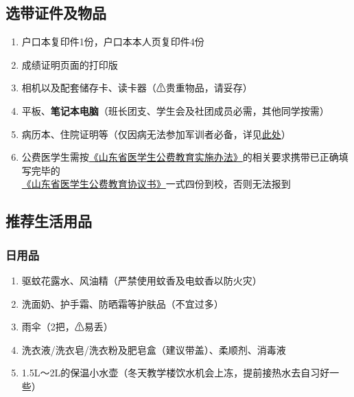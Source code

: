 \subsection[选带证件及物品]{选带证件及物品}
\begin{enumerate}
    \item 户口本复印件1份，户口本本人页复印件4份\footnotemark
    \item 成绩证明页面的打印版\footnotemark
    \item 相机以及配套储存卡、读卡器（⚠贵重物品，请妥存）
    \item 平板\footnotemark、\textbf{笔记本电脑}（班长团支、学生会及社团成员必需，其他同学按需）
    \item 病历本、住院证明等（仅因病无法参加军训者必备，详见\hyperref[exercise_unattend]{此处}）
    \item 公费医学生需按\href{http://www.shandong.gov.cn/art/2021/10/14/art_100623_39304.html}{《山东省医学生公费教育实施办法》}的相关要求携带已正确填写完毕的\\%
          \href{http://app.shandong.gov.cn/attach/2021/28/60-1.pdf}{《山东省医学生公费教育协议书》}一式四份到校，否则无法报到\footnotemark
\end{enumerate}

\subsection[推荐生活用品]{推荐生活用品}

\subsubsection[日用品]{日用品}
\begin{enumerate}
    \item 驱蚊花露水、风油精（严禁使用蚊香及电蚊香以防火灾）
    \item 洗面奶、护手霜、防晒霜等护肤品（不宜过多）
    \item 雨伞（2把，⚠易丢）
    \item 洗衣液/洗衣皂/洗衣粉及肥皂盒（建议带盖）、柔顺剂、消毒液
    \item 1.5L～2L的保温小水壶（冬天教学楼饮水机会上冻，提前接热水去自习好一些）
\end{enumerate}


